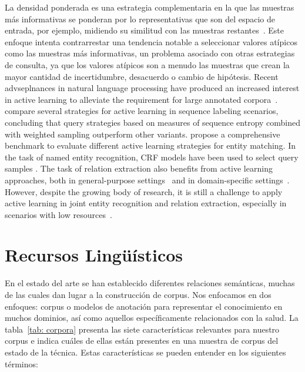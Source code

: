 La densidad ponderada es una estrategia complementaria en la que las muestras más informativas se ponderan por lo representativas que son del espacio de entrada, por ejemplo, midiendo su similitud con las muestras restantes~\cite{settles2008analysis}.
Este enfoque intenta contrarrestar una tendencia notable a seleccionar valores atípicos como las muestras más informativas, un problema asociado con otras estrategias de consulta, ya que los valores atípicos son a menudo las muestras que crean la mayor cantidad de incertidumbre, desacuerdo o cambio de hipótesis.
Recent advseplnances in natural language processing have produced an increased interest in active learning to alleviate the requirement for large annotated corpora~\cite{Olsson2009ALS, Tchoua2019ActiveLY}.
\citet{settles2008analysis} compare several strategies for active learning in sequence labeling scenarios, concluding that query strategies based on measures of sequence entropy combined with weighted sampling outperform other variants.
\citet{Meduri2020ACB} propose a comprehensive benchmark to evaluate different active learning strategies for entity matching.
In the task of named entity recognition, CRF models have been used to select query samples
\citep{Claveau2017StrategiesTS, Lin2019AlpacaTagAA}.
The task of relation extraction also benefits from active learning approaches, both in general-purpose settings~\cite{fu2013efficient} and in domain-specific settings~\cite{zhang2012unified}.
However, despite the growing body of research, it is still a challenge to apply active learning in joint entity recognition and relation extraction, especially in scenarios with low resources~\cite{Gao2019ActiveER}.

\section{Recursos Lingüísticos}

En el estado del arte se han establecido diferentes relaciones semánticas, muchas de las cuales dan lugar a la construcción de corpus. Nos enfocamos en dos enfoques: corpus o modelos de anotación para representar el conocimiento en muchos dominios, así como aquellos específicamente relacionados con la salud.
La tabla~\ref{tab: corpora} presenta las siete características relevantes para nuestro corpus e indica cuáles de ellas están presentes en una muestra de corpus del estado de la técnica.
Estas características se pueden entender en los siguientes términos:

